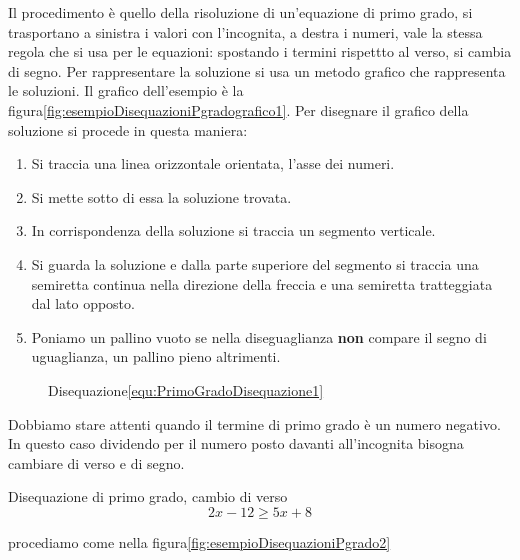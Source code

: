 Il procedimento è  quello della risoluzione di un'equazione di primo grado, si trasportano a sinistra i valori con l'incognita, a destra i numeri, vale la stessa regola che si usa per le equazioni: spostando i termini rispettto al verso, si cambia di segno. Per rappresentare la soluzione si usa un metodo grafico che rappresenta le soluzioni. Il grafico dell'esempio è la figura\nobs\vref{fig:esempioDisequazioniPgradografico1}. Per disegnare il grafico della soluzione si procede in questa maniera: 
\begin{procedurat}{}{}
	\begin{enumerate}
		\item Si traccia una linea orizzontale orientata, l'asse dei numeri.
		\item Si mette sotto di essa la soluzione trovata.
		\item In corrispondenza della soluzione si traccia un segmento verticale.
		\item Si guarda la soluzione e dalla parte superiore del segmento si traccia una semiretta continua nella direzione della freccia e una semiretta tratteggiata dal lato opposto.
		\item Poniamo un pallino vuoto se nella diseguaglianza \textbf{non} compare il segno di uguaglianza, un pallino pieno altrimenti.
	\end{enumerate}
\end{procedurat}
\begin{figure}
	\centering
	\captionsetup{format=grafico,list=no}
	\caption[]{Disequazione\nobs\vref{equ:PrimoGradoDisequazione1}}
	\label{fig:esempioDisequazioniPgradografico1}
\end{figure}
Dobbiamo stare attenti quando il termine di primo grado è un numero negativo. In questo caso dividendo per il numero posto davanti all'incognita bisogna cambiare di verso e di segno.
\begin{esempiot}{Disequazione di primo grado, cambio di verso}{}
	\begin{equation}
	2x-12\geq 5x+8\label{equ:PrimoGradoDisequazione2}
	\end{equation}
\end{esempiot}
procediamo come nella figura\nobs\vref{fig:esempioDisequazioniPgrado2}

